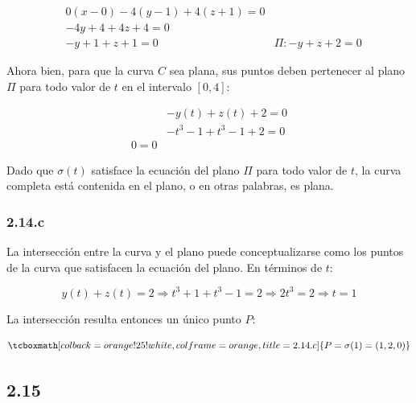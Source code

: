 \documentclass{article}
\begin{document}
\begin{subequations}
\begin{align}
& 0 (x-0) -4 (y-1) + 4 (z+1) = 0 \\
& -4y +4 + 4z + 4 = 0 \\
& -y + 1 + z + 1 = 0
& \Pi: -y + z + 2 = 0
\end{align}
\end{subequations}

Ahora bien, para que la curva $C$ sea plana, sus puntos deben pertenecer al plano $\Pi$ para todo valor de $t$ en el intervalo $[0,4]$:

\begin{subequations}
\begin{align}
& -y(t) + z(t) + 2 = 0 \\
& -t^3-1 +t^3-1 + 2 = 0\\
0 = 0
\end{align}
\end{subequations}

Dado que $\sigma(t)$ satisface la ecuación del plano $\Pi$ para todo valor de $t$, la curva completa está contenida en el plano, o en otras palabras, es plana.

\subsubsection*{2.14.c}
\label{subsubsec:2.14.c}

La intersección entre la curva y el plano puede conceptualizarse como los puntos de la curva que satisfacen la ecuación del plano. En términos de $t$:

\begin{equation}
y(t) + z(t) = 2 \Rightarrow t^3 +1 +t^3 -1 = 2 \Rightarrow 2t^3 = 2 \Rightarrow t = 1
\end{equation}

La intersección resulta entonces un único punto $P$:

\begin{equation}
\tcboxmath[colback=orange!25!white,colframe=orange,title=2.14.c]
{
P = \sigma(1) = (1, 2, 0)
}
\end{equation}

\subsection*{2.15}
\label{subsec:2.15}
\end{document}
